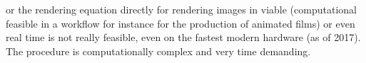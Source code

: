 \documentclass[%
    a4paper,    %
    justified,  %
    nobib,      %
    openany     %
]{tufte-book}
\begin{document}

 or the rendering equation
directly for rendering images in viable (computational feasible in a workflow
for instance for the production of animated films) or even real time is not
really feasible, even on the fastest modern hardware (as of 2017). The procedure
is computationally complex and very time demanding.
\end{document}
